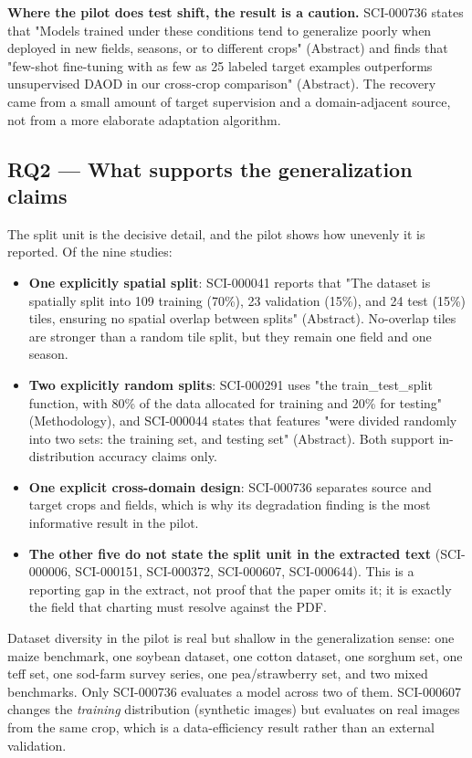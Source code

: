 \documentclass{article}
\begin{document}
\textbf{Where the pilot does test shift, the result is a caution.} SCI-000736 states
that "Models trained under these conditions tend to generalize poorly when deployed
in new fields, seasons, or to different crops" (Abstract) and finds that "few-shot
fine-tuning with as few as 25 labeled target examples outperforms unsupervised DAOD
in our cross-crop comparison" (Abstract). The recovery came from a small amount of
target supervision and a domain-adjacent source, not from a more elaborate
adaptation algorithm.

\subsection{RQ2 — What supports the generalization claims}

The split unit is the decisive detail, and the pilot shows how unevenly it is
reported. Of the nine studies:

\begin{itemize}
\item \textbf{One explicitly spatial split}: SCI-000041 reports that "The dataset is
  spatially split into 109 training (70\%), 23 validation (15\%), and 24 test (15\%)
  tiles, ensuring no spatial overlap between splits" (Abstract). No-overlap tiles
  are stronger than a random tile split, but they remain one field and one season.
\item \textbf{Two explicitly random splits}: SCI-000291 uses "the train\_test\_split
  function, with 80\% of the data allocated for training and 20\% for testing"
  (Methodology), and SCI-000044 states that features "were divided randomly into
  two sets: the training set, and testing set" (Abstract). Both support
  in-distribution accuracy claims only.
\item \textbf{One explicit cross-domain design}: SCI-000736 separates source and target
  crops and fields, which is why its degradation finding is the most informative
  result in the pilot.
\item \textbf{The other five do not state the split unit in the extracted text}
  (SCI-000006, SCI-000151, SCI-000372, SCI-000607, SCI-000644). This is
  a reporting gap in the extract, not proof that the paper omits it; it is exactly
  the field that charting must resolve against the PDF.
\end{itemize}

Dataset diversity in the pilot is real but shallow in the generalization sense:
one maize benchmark, one soybean dataset, one cotton dataset, one sorghum set, one
teff set, one sod-farm survey series, one pea/strawberry set, and two mixed
benchmarks. Only SCI-000736 evaluates a model across two of them. SCI-000607
changes the \textit{training} distribution (synthetic images) but evaluates on real images
from the same crop, which is a data-efficiency result rather than an external
validation.
\end{document}
